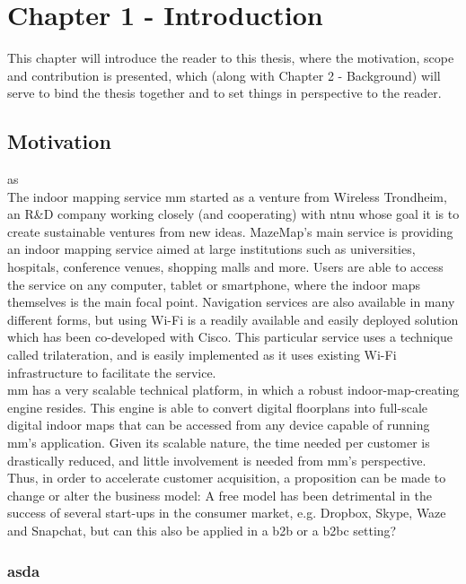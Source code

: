 \chapter{Chapter 1 - Introduction}
This chapter will introduce the reader to this thesis, where the motivation, scope and contribution is presented, which (along with Chapter 2 - Background) will serve to bind the thesis together and to set things in perspective to the reader.
\section{Motivation}
as
\newline
\\
The indoor mapping service \gls{mm} started as a venture from Wireless Trondheim, an R\&D company working closely (and cooperating) with \gls{ntnu} whose goal it is to create sustainable ventures from new ideas. MazeMap's main service is providing an indoor mapping service aimed at large institutions such as universities, hospitals, conference venues, shopping malls and more. Users are able to access the service on any computer, tablet or smartphone, where the indoor maps themselves is the main focal point. Navigation services are also available in many different forms, but using Wi-Fi is a readily available and easily deployed solution which has been co-developed with Cisco. This particular service uses a technique called trilateration\cite{BiczokMJK14}, and is easily implemented as it uses existing Wi-Fi infrastructure to facilitate the service.
\newline
\\
\gls{mm} has a very scalable technical platform, in which a robust indoor-map-creating engine resides. This engine is able to convert digital floorplans into full-scale digital indoor maps that can be accessed from any device capable of running \gls{mm}'s application. Given its scalable nature, the time needed per customer is drastically reduced, and little involvement is needed from \gls{mm}'s perspective. Thus, in order to accelerate customer acquisition, a proposition can be made to change or alter the business model: A free model has been detrimental in the success of several start-ups in the consumer market, e.g. Dropbox, Skype, Waze and Snapchat, but can this also be applied in a \gls{b2b} or a \gls{b2bc} setting?

\subsection{asda}

